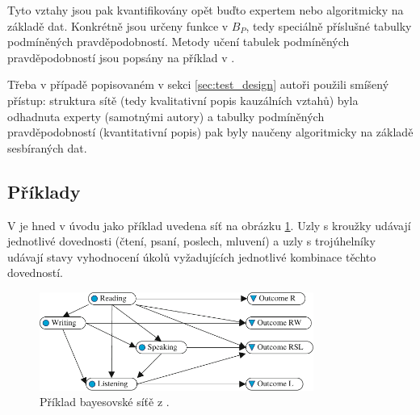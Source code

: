 \documentclass[a4paper,twoside,12pt]{scrbook}
\begin{document}
Tyto vztahy jsou pak kvantifikovány opět buďto expertem nebo algoritmicky na základě dat. Konkrétně jsou určeny funkce v $B_P$, tedy speciálně příslušné tabulky podmíněných pravděpodobností. Metody učení tabulek podmíněných pravděpodobností jsou popsány na příklad v \cite[kapitola~9]{almond_tlustospis}.

Třeba v případě popisovaném v sekci \ref{sec:test_design} autoři použili smíšený přístup: struktura sítě (tedy kvalitativní popis kauzálních vztahů) byla odhadnuta experty (samotnými autory) a tabulky podmíněných pravděpodobností (kvantitativní popis) pak byly naučeny algoritmicky na základě sesbíraných dat.



\subsection{Příklady}
\label{sec:net_examples}
V \cite{almond_tlustospis} je hned v úvodu jako příklad uvedena síť na obrázku \ref{fig:almond_BN_example}. Uzly s kroužky udávají jednotlivé dovednosti (čtení, psaní, poslech, mluvení) a uzly s trojúhelníky udávají stavy vyhodnocení úkolů vyžadujících jednotlivé kombinace těchto dovedností.

\begin{figure}
  \centering
    \includegraphics[width=0.8\textwidth]{almond_BN_example.pdf}
  \caption{Příklad bayesovské síťě z \cite{almond_tlustospis}.}
  \label{fig:almond_BN_example}
\end{figure}
\end{document}
